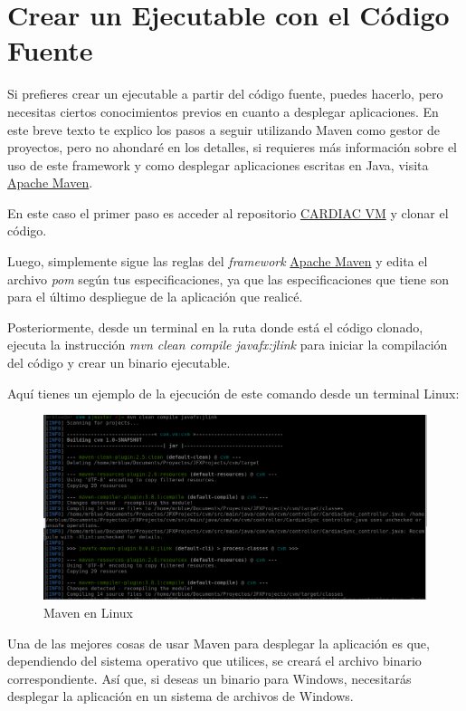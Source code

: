 \documentclass[letterpaper,12pt,oneside]{book}
\begin{document}
\section{Crear un Ejecutable con el Código Fuente}

Si prefieres crear un ejecutable a partir del código fuente, puedes hacerlo, pero necesitas ciertos conocimientos previos
en cuanto a desplegar aplicaciones. En este breve texto te explico los pasos a seguir utilizando Maven como gestor de proyectos,
pero no ahondaré en los detalles, si  requieres más información sobre el uso de este framework y como desplegar aplicaciones escritas en Java, visita \href{https://maven.apache.org/}{Apache Maven}.

En este caso el primer paso es acceder al repositorio 
\href{https://github.com/OsvaldoSan/CARDIAC_VM}{CARDIAC VM}
 y clonar el código.

Luego, simplemente sigue las reglas del \textit{framework} \href{https://maven.apache.org/}{Apache Maven} y edita el archivo 
\textit{pom} según tus especificaciones, ya que las especificaciones que tiene son para el último despliegue de la aplicación
que realicé.

Posteriormente, desde un terminal en la ruta donde está el código clonado, ejecuta la instrucción \textit{mvn clean compile javafx:jlink} para
iniciar la compilación del código y crear un binario ejecutable.

Aquí tienes un ejemplo de la ejecución de este comando desde un terminal Linux:

\begin{figure}[h]		
				\centering
				\includegraphics[scale=0.3]{media_g/maven_execution_linux.png}
				\caption{Maven en Linux}
				\label{fig:github_mavenlinuxcard}
\end{figure}

Una de las mejores cosas de usar Maven para desplegar la aplicación es que, dependiendo del sistema operativo que utilices, se creará el archivo binario correspondiente. Así que, si deseas un binario para Windows, necesitarás desplegar la aplicación en un sistema de archivos de Windows.

		
\end{document}
